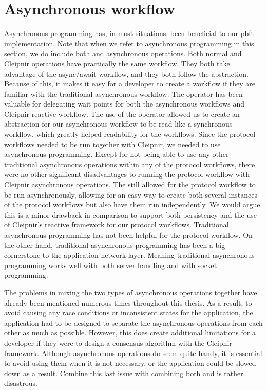\section{Asynchronous workflow}
Asynchronous programming has, in most situations, been beneficial to our \ac{pbft} implementation. Note that when we refer to asynchronous programming in this section, we do include both  and  asynchronous operations. Both normal  and Cleipnir  operations have practically the same workflow. They both take advantage of the async/await workflow, and they both follow the  abstraction. Because of this, it makes it easy for a developer to create a  workflow if they are familiar with the traditional asynchronous workflow. The  operator has been valuable for delegating wait points for both the asynchronous workflows and Cleipnir reactive workflow. The use of the  operator allowed us to create an abstraction for our asynchronous workflow to be read like a synchronous workflow, which greatly helped readability for the workflows. Since the protocol workflows needed to be run together with Cleipnir, we needed to use  asynchronous programming. Except for not being able to use any other traditional asynchronous operations within any of the protocol workflows, there were no other significant disadvantages to running the protocol workflow with Cleipnir asynchronous operations. The  still allowed for the protocol workflow to be run asynchronously, allowing for an easy way to create both several instances of the protocol workflows but also have them run independently. We would argue this is a minor drawback in comparison to support both persistency and the use of Cleipnir's reactive framework for our protocol workflows.
Traditional asynchronous programming has not been helpful for the protocol workflow. On the other hand, traditional asynchronous programming has been a big cornerstone to the application network layer. Meaning traditional asynchronous programming works well with both server handling and with socket programming.  

The problems in mixing the two types of asynchronous operations together have already been mentioned numerous times throughout this thesis. As a result, to avoid causing any race conditions or inconsistent states for the application, the application had to be designed to separate the asynchronous operations from each other as much as possible. However, this does create additional limitations for a developer if they were to design a consensus algorithm with the Cleipnir framework. Although asynchronous operations do seem quite handy, it is essential to avoid using them when it is not necessary, or the application could be slowed down as a result. Combine this last issue with combining both  and  is rather disastrous. 

